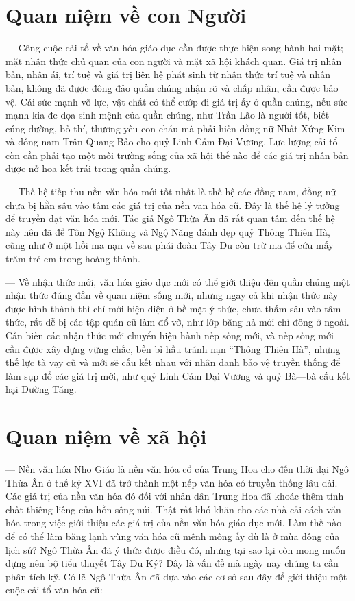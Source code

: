 \section{Quan niệm về con Người} %
\label{sec:47_48_con_nguoi}

— Công cuộc cải tổ về văn hóa giáo dục cần được thực hiện song hành hai mặt; mặt nhận thức chủ quan của con người và mặt xã hội khách quan. Giá trị nhân bản, nhân ái, trí tuệ và giá trị liên hệ phát sinh từ nhận thức trí tuệ và nhân bản, không đã được đông đảo quần chúng nhận rõ và chấp nhận, cần được bảo vệ. Cái sức mạnh võ lực, vật chất có thể cướp đi giá trị ấy ở quần chúng, nếu sức mạnh kia đe dọa sinh mệnh của quần chúng, như Trần Lão là người tốt, biết cúng dường, bố thí, thương yêu con cháu mà phải hiến đồng nữ Nhất Xứng Kim và đồng nam Trân Quang Bảo cho quỷ Linh Cảm Đại Vương. Lực lượng cải tổ còn cần phải tạo một môi trường sống của xã hội thế nào để các giá trị nhân bản được nở hoa kết trái trong quần chúng.

— Thế hệ tiếp thu nền văn hóa mới tốt nhất là thế hệ các đồng nam, đồng nữ chưa bị hằn sâu vào tâm các giá trị của nền văn hóa cũ. Đây là thế hệ lý tưởng để truyền đạt văn hóa mới. Tác giả Ngô Thừa Ân đã rất quan tâm đến thế hệ này nên đã để Tôn Ngộ Không và Ngộ Năng đánh dẹp quỷ Thông Thiên Hà, cũng như ở một hồi ma nạn về sau phái đoàn Tây Du còn trừ ma để cứu mấy trăm trẻ em trong hoàng thành.

— Về nhận thức mới, văn hóa giáo dục mới có thể giới thiệu đên quần chúng một nhận thức đúng đắn về quan niệm sống mới, nhưng ngay cả khi nhận thức này được hình thành thì chỉ mới hiện diện ở bề mặt ý thức, chưa thấm sâu vào tâm thức, rất dễ bị các tập quán cũ làm đổ vỡ, như lớp băng hà mới chỉ đông ở ngoài. Cần biến các nhận thức mới chuyển hiện hành nếp sống mới, và nếp sống mới cần được xây dựng vững chắc, bền bỉ hầu tránh nạn ``Thông Thiên Hà'', những thế lực tà vạy cũ và mới sẽ cấu kết nhau với nhân danh bảo vệ truyền thống để làm sụp đổ các giá trị mới, như quỷ Linh Cảm Đại Vương và quỷ Bà—bà cấu kết hại Đường Tăng.

\section{Quan niệm về xã hội} %
\label{sec:47_48_xa_hoi}

— Nền văn hóa Nho Giáo là nền văn hóa cổ của Trung Hoa cho đến thời dại Ngô Thừa Ân ở thế kỷ XVI đã trở thành một nếp văn hóa có truyền thống lâu dài. Các giá trị của nền văn hóa đó đối với nhân dân Trung Hoa đã khoác thêm tính chất thiêng liêng của hồn sông núi. Thật rất khó khăn cho các nhà cải cách văn hóa trong việc giới thiệu các giá trị của nền văn hóa giáo dục mới. Làm thế nào để có thể làm băng lạnh vùng văn hóa cũ mênh mông ấy dù là ở mùa đông của lịch sử? Ngô Thừa Ân đã ý thức được điều đó, nhưng tại sao lại còn mong muốn dựng nên bộ tiểu thuyết Tây Du Ký? Đây là vấn đề mà ngày nay chúng ta cần phân tích kỹ. Có lẽ Ngô Thừa Ân đã dựa vào các cơ sở sau đây để giới thiệu một cuộc cải tổ văn hóa cũ:

